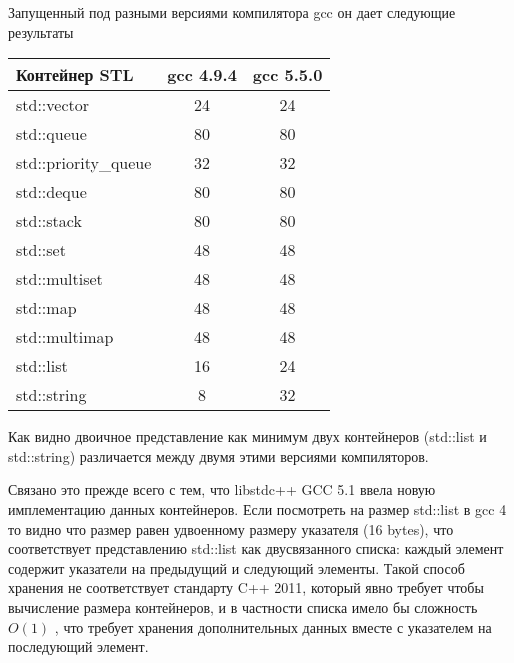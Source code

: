 \documentclass[14pt,a4paper]{article}
\begin{document}
Запущенный под разными версиями компилятора gcc он дает следующие
результаты 
\begin{longtable}{|l|c|c|}
\hline
Контейнер STL & gcc 4.9.4 & gcc 5.5.0 \\
\hline
std::vector & 24 & 24 \\
std::queue & 80 & 80 \\
std::priority\_queue & 32 & 32 \\
std::deque & 80 & 80 \\
std::stack & 80 & 80 \\
std::set & 48 & 48 \\
std::multiset & 48 & 48 \\
std::map & 48 & 48 \\
std::multimap & 48 & 48 \\
std::list & 16 & 24 \\
std::string & 8 & 32 \\
\hline
\end{longtable}

Как видно двоичное представление как минимум двух контейнеров
(std::list и std::string) различается между двумя этими версиями
компиляторов.

Связано это прежде всего с тем, что libstdc++ GCC 5.1 ввела
\cite{DualABI}  новую имплементацию данных контейнеров. Если
посмотреть на размер std::list в gcc 4 то видно что размер равен
удвоенному размеру
указателя (16 bytes), что соответствует представлению std::list как
двусвязанного списка: каждый элемент содержит указатели на предыдущий
и следующий элементы. Такой способ хранения не соответствует стандарту
C++ 2011, который явно требует чтобы вычисление размера контейнеров, и
в частности списка имело бы сложность $O(1)$ \cite{cpp11}, что требует хранения
дополнительных данных вместе с указателем на последующий элемент.  





\end{document}
